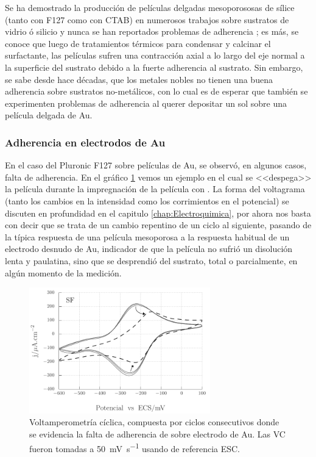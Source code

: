 		Se ha demostrado la producción de películas delgadas mesoporososas de sílice (tanto con F127 como con CTAB) en numerosos trabajos sobre sustratos de vidrio ó silicio y nunca se han reportados problemas de adherencia \cite{Angelome2008,Fuertes2010,Violi2015}; es más, se conoce que luego de tratamientos térmicos para condensar y calcinar el surfactante, las películas sufren una contracción axial a lo largo del eje normal a la superficie del sustrato debido a la fuerte adherencia al sustrato.\cite{Soler-Illia2012,Martinez2009} Sin embargo, se sabe desde hace décadas, que los metales nobles no tienen una buena adherencia sobre sustratos no-metálicos\cite{Kern1990,Hieber1976}, con lo cual es de esperar que también se experimenten problemas de adherencia al querer depositar un sol sobre una película delgada de Au. 

		\subsubsection{Adherencia en electrodos de Au}

			En el caso del Pluronic F127 sobre películas de Au, se observó, en algunos casos, falta de adherencia. En el gráfico \ref{fig:adherencia_F127} vemos un ejemplo en el cual se <<despega>> la película durante la impregnación de la película con \aminorutenio. La forma del voltagrama (tanto los cambios en la intensidad como los corrimientos en el potencial) se discuten en profundidad en el capitulo \ref{chap:Electroquimica}, por ahora nos basta con decir que se trata de un cambio repentino de un ciclo al siguiente, pasando de la típica respuesta de una película mesoporosa a la respuesta habitual de un electrodo desnudo de Au, indicador de que la película no sufrió un disolución lenta y paulatina, sino que se desprendió del sustrato, total o parcialmente, en algún momento de la medición.
				\begin{figure}[th]
				 	   	    \begin{center} 
				        	\includegraphics[width=0.70\textwidth]{Graficos/Adherencia_F127.pdf}
				       		\caption[Adherencia de \pdmF \space sobre una película delgada de Au.]{Voltamperometría cíclica, compuesta por ciclos consecutivos donde se evidencia la falta de adherencia de \pdmF \space sobre electrodo de Au. Las VC fueron tomadas a \SI{50}{\milli\volt.\second^{-1}} usando de referencia ESC.}
				         	\label{fig:adherencia_F127}
				     		\end{center}
				     		\end{figure}

